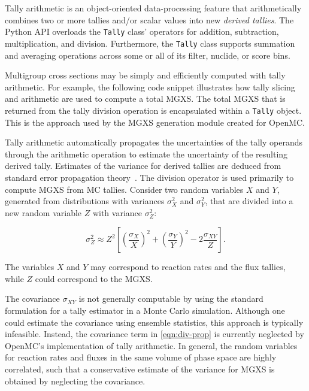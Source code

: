 Tally arithmetic is an object-oriented data-processing feature that arithmetically combines two or more tallies and/or scalar values into new \emph{derived tallies}. The Python API overloads the \texttt{Tally} class' operators for addition, subtraction, multiplication, and division. Furthermore, the \texttt{Tally} class supports summation and averaging operations across some or all of its filter, nuclide, or score bins.

Multigroup cross sections may be simply and efficiently computed with tally arithmetic. For example, the following code snippet illustrates how tally slicing and arithmetic are used to compute a total MGXS. The total MGXS that is returned from the tally division operation is encapsulated within a \texttt{Tally} object. This is the approach used by the MGXS generation module created for OpenMC.



Tally arithmetic automatically propagates the uncertainties of the tally operands through the arithmetic operation to estimate the uncertainty of the resulting derived tally. Estimates of the variance for derived tallies are deduced from standard error propagation theory~\cite{bevington2003data}. The division operator is used primarily to compute MGXS from MC tallies. Consider two random variables $X$ and $Y$, generated from distributions with variances $\sigma_{X}^2$ and $\sigma_{Y}^2$, that are divided into a new random variable $Z$ with variance $\sigma_{Z}^2$:

\begin{equation}
\label{eqn:div-prop}
\sigma_{Z}^{2} \approx Z^{2}\left[\left(\frac{\sigma_{X}}{X}\right)^{2} + \left(\frac{\sigma_{Y}}{Y}\right)^{2} - 2\frac{\sigma_{XY}}{Z}\right].
\end{equation}

\noindent The variables $X$ and $Y$ may correspond to reaction rates and the flux tallies, while $Z$ could correspond to the MGXS.

The covariance $\sigma_{XY}$ is not generally computable by using the standard formulation for a tally estimator in a Monte Carlo simulation. Although one could estimate the covariance using ensemble statistics, this approach is typically infeasible. Instead, the covariance term in \cref{eqn:div-prop} is currently neglected by OpenMC's implementation of tally arithmetic. In general, the random variables for reaction rates and fluxes in the same volume of phase space are highly correlated, such that a conservative estimate of the variance for MGXS is obtained by neglecting the covariance.

